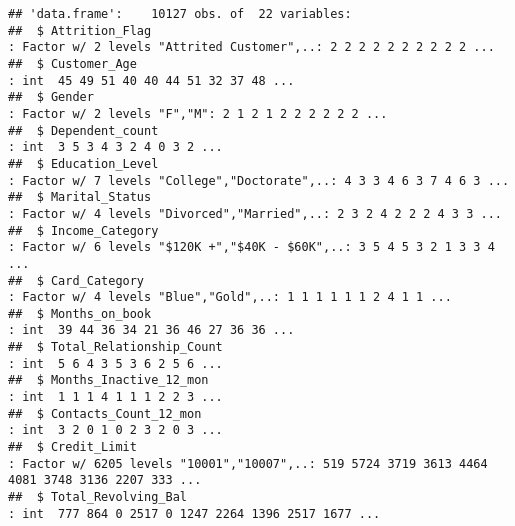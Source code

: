 \documentclass[
]{article}
\begin{document}
\begin{verbatim}
## 'data.frame':    10127 obs. of  22 variables:
##  $ Attrition_Flag                                                                                                                    : Factor w/ 2 levels "Attrited Customer",..: 2 2 2 2 2 2 2 2 2 2 ...
##  $ Customer_Age                                                                                                                      : int  45 49 51 40 40 44 51 32 37 48 ...
##  $ Gender                                                                                                                            : Factor w/ 2 levels "F","M": 2 1 2 1 2 2 2 2 2 2 ...
##  $ Dependent_count                                                                                                                   : int  3 5 3 4 3 2 4 0 3 2 ...
##  $ Education_Level                                                                                                                   : Factor w/ 7 levels "College","Doctorate",..: 4 3 3 4 6 3 7 4 6 3 ...
##  $ Marital_Status                                                                                                                    : Factor w/ 4 levels "Divorced","Married",..: 2 3 2 4 2 2 2 4 3 3 ...
##  $ Income_Category                                                                                                                   : Factor w/ 6 levels "$120K +","$40K - $60K",..: 3 5 4 5 3 2 1 3 3 4 ...
##  $ Card_Category                                                                                                                     : Factor w/ 4 levels "Blue","Gold",..: 1 1 1 1 1 1 2 4 1 1 ...
##  $ Months_on_book                                                                                                                    : int  39 44 36 34 21 36 46 27 36 36 ...
##  $ Total_Relationship_Count                                                                                                          : int  5 6 4 3 5 3 6 2 5 6 ...
##  $ Months_Inactive_12_mon                                                                                                            : int  1 1 1 4 1 1 1 2 2 3 ...
##  $ Contacts_Count_12_mon                                                                                                             : int  3 2 0 1 0 2 3 2 0 3 ...
##  $ Credit_Limit                                                                                                                      : Factor w/ 6205 levels "10001","10007",..: 519 5724 3719 3613 4464 4081 3748 3136 2207 333 ...
##  $ Total_Revolving_Bal                                                                                                               : int  777 864 0 2517 0 1247 2264 1396 2517 1677 ...

\end{verbatim}
\end{document}
